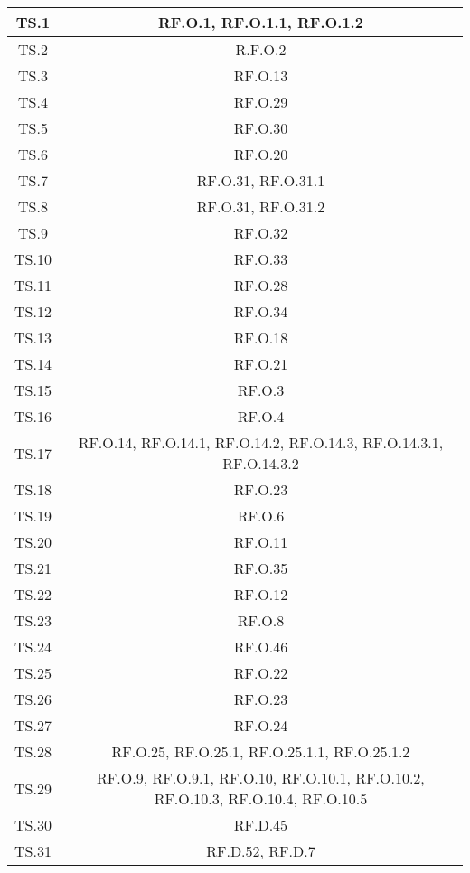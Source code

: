 \begin{adjustwidth}{-0.5cm}{-0.5cm}
\begin{longtable}{|c|c|}
    TS.1 & RF.O.1, RF.O.1.1, RF.O.1.2\\
		\hline TS.2 & R.F.O.2\\
		\hline TS.3 & RF.O.13\\
		\hline TS.4 & RF.O.29\\
		\hline TS.5 & RF.O.30\\
		\hline TS.6 & RF.O.20\\
		\hline TS.7 & RF.O.31, RF.O.31.1\\
		\hline TS.8 & RF.O.31, RF.O.31.2\\
		\hline TS.9 & RF.O.32\\
		\hline TS.10 & RF.O.33\\
		\hline TS.11 & RF.O.28\\
		\hline TS.12 & RF.O.34\\
		\hline TS.13 & RF.O.18\\
		\hline TS.14 & RF.O.21\\
		\hline TS.15 & RF.O.3\\
		\hline TS.16 & RF.O.4\\
		\hline TS.17 & RF.O.14, RF.O.14.1, RF.O.14.2, RF.O.14.3, RF.O.14.3.1, RF.O.14.3.2\\
		\hline TS.18 & RF.O.23\\
		\hline TS.19 & RF.O.6\\
		\hline TS.20 & RF.O.11\\
		\hline TS.21 & RF.O.35\\
		\hline TS.22 & RF.O.12\\
		\hline TS.23 & RF.O.8\\
		\hline TS.24 & RF.O.46\\
		\hline TS.25 & RF.O.22\\
		\hline TS.26 & RF.O.23\\
		\hline TS.27 & RF.O.24\\
		\hline TS.28 & RF.O.25, RF.O.25.1, RF.O.25.1.1, RF.O.25.1.2\\
		\hline TS.29 & RF.O.9, RF.O.9.1, RF.O.10, RF.O.10.1, RF.O.10.2, RF.O.10.3, RF.O.10.4, RF.O.10.5\\
		\hline TS.30 & RF.D.45\\
		\hline TS.31 & RF.D.52, RF.D.7\\
  \end{longtable}
\end{adjustwidth}
\egroup

